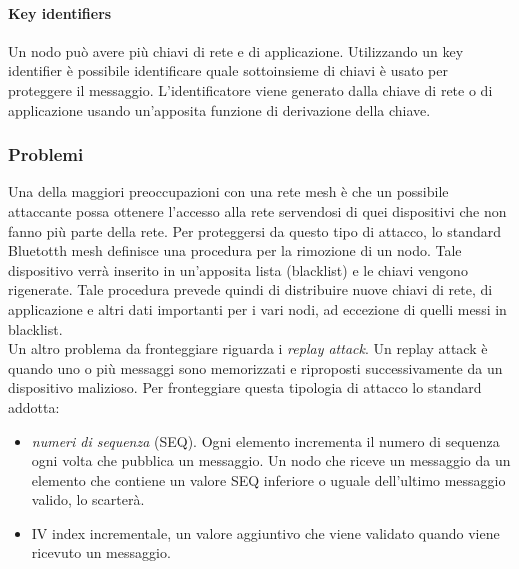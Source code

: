 \paragraph{Key identifiers}
Un nodo può avere più chiavi di rete e di applicazione. Utilizzando un key identifier è possibile identificare quale sottoinsieme di chiavi è usato per proteggere il messaggio. L'identificatore viene generato dalla chiave di rete o di applicazione usando un'apposita funzione di derivazione della chiave.

\subsubsection{Problemi}
Una della maggiori preoccupazioni con una rete mesh è che un possibile attaccante possa ottenere l'accesso alla rete servendosi di quei dispositivi che non fanno più parte della rete. Per proteggersi da questo tipo di attacco, lo standard Bluetotth mesh definisce una procedura per la rimozione di un nodo. Tale dispositivo verrà inserito in un'apposita lista (blacklist) e le chiavi vengono rigenerate. Tale procedura prevede quindi di distribuire nuove chiavi di rete, di applicazione e altri dati importanti per i vari nodi, ad eccezione di quelli messi in blacklist.\\
Un altro problema da fronteggiare riguarda i \textit{replay attack}. Un replay attack è quando uno o più messaggi sono memorizzati e riproposti successivamente da un dispositivo malizioso. Per fronteggiare questa tipologia di attacco lo standard addotta:
\begin{itemize}
    \item \textit{numeri di sequenza} (SEQ). Ogni elemento incrementa il numero di sequenza ogni volta che pubblica un messaggio. Un nodo che riceve un messaggio da un elemento che contiene un valore SEQ inferiore o uguale dell'ultimo messaggio valido, lo scarterà.
    
    \item IV index incrementale, un valore aggiuntivo che viene validato quando viene ricevuto un messaggio.
\end{itemize}

